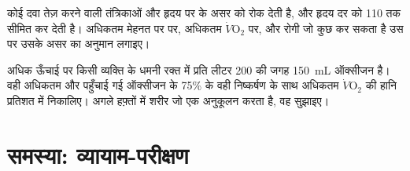 \begin{exercise}[$\star\star\star$]\label{exo:g10:heart-lungs-effort:14}
कोई दवा तेज़ करने वाली तंत्रिकाओं और हृदय पर  के असर को रोक
देती है, और हृदय दर को 110 तक सीमित कर देती है। अधिकतम मेहनत पर
 पर, अधिकतम $\dot V\!\mathrm{O_2}$ पर, और रोगी जो कुछ कर सकता
है उस पर उसके असर का अनुमान लगाइए।
\end{exercise}

\begin{exercise}[$\star\star\star$]\label{exo:g10:heart-lungs-effort:15}
अधिक ऊँचाई पर किसी व्यक्ति के धमनी रक्त में प्रति लीटर \num{200} की जगह
\qty{150}{mL} ऑक्सीजन है। वही अधिकतम  और पहुँचाई गई ऑक्सीजन के
75\% के वही निष्कर्षण के साथ अधिकतम $\dot V\!\mathrm{O_2}$ की हानि
प्रतिशत में निकालिए। अगले हफ़्तों में शरीर जो एक अनुकूलन करता है, वह
सुझाइए।
\end{exercise}

\section{समस्या: व्यायाम-परीक्षण}

